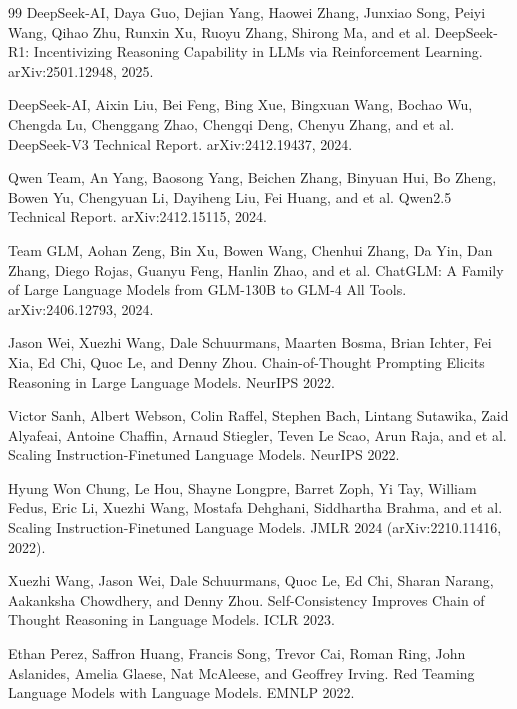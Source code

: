 \documentclass{article}
\begin{document}
\begin{thebibliography}{99}
DeepSeek-AI, Daya Guo, Dejian Yang, Haowei Zhang, Junxiao Song, Peiyi Wang, Qihao Zhu, Runxin Xu, Ruoyu Zhang, Shirong Ma, and et al.
\newblock DeepSeek-R1: Incentivizing Reasoning Capability in LLMs via Reinforcement Learning.
\newblock arXiv:2501.12948, 2025.

DeepSeek-AI, Aixin Liu, Bei Feng, Bing Xue, Bingxuan Wang, Bochao Wu, Chengda Lu, Chenggang Zhao, Chengqi Deng, Chenyu Zhang, and et al.
\newblock DeepSeek-V3 Technical Report.
\newblock arXiv:2412.19437, 2024.

Qwen Team, An Yang, Baosong Yang, Beichen Zhang, Binyuan Hui, Bo Zheng, Bowen Yu, Chengyuan Li, Dayiheng Liu, Fei Huang, and et al.
\newblock Qwen2.5 Technical Report.
\newblock arXiv:2412.15115, 2024.

Team GLM, Aohan Zeng, Bin Xu, Bowen Wang, Chenhui Zhang, Da Yin, Dan Zhang, Diego Rojas, Guanyu Feng, Hanlin Zhao, and et al.
\newblock ChatGLM: A Family of Large Language Models from GLM-130B to GLM-4 All Tools.
\newblock arXiv:2406.12793, 2024.

Jason Wei, Xuezhi Wang, Dale Schuurmans, Maarten Bosma, Brian Ichter, Fei Xia, Ed Chi, Quoc Le, and Denny Zhou.
\newblock Chain-of-Thought Prompting Elicits Reasoning in Large Language Models.
\newblock NeurIPS 2022.

Victor Sanh, Albert Webson, Colin Raffel, Stephen Bach, Lintang Sutawika, Zaid Alyafeai, Antoine Chaffin, Arnaud Stiegler, Teven Le Scao, Arun Raja, and et al.
\newblock Scaling Instruction-Finetuned Language Models.
\newblock NeurIPS 2022.

Hyung Won Chung, Le Hou, Shayne Longpre, Barret Zoph, Yi Tay, William Fedus, Eric Li, Xuezhi Wang, Mostafa Dehghani, Siddhartha Brahma, and et al.
\newblock Scaling Instruction-Finetuned Language Models.
\newblock JMLR 2024 (arXiv:2210.11416, 2022).

Xuezhi Wang, Jason Wei, Dale Schuurmans, Quoc Le, Ed Chi, Sharan Narang, Aakanksha Chowdhery, and Denny Zhou.
\newblock Self-Consistency Improves Chain of Thought Reasoning in Language Models.
\newblock ICLR 2023.

Ethan Perez, Saffron Huang, Francis Song, Trevor Cai, Roman Ring, John Aslanides, Amelia Glaese, Nat McAleese, and Geoffrey Irving.
\newblock Red Teaming Language Models with Language Models.
\newblock EMNLP 2022.


\end{thebibliography}
\end{document}
